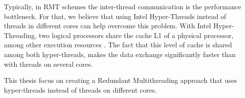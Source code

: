 Typically, in RMT schemes the inter-thread communication is the performance bottleneck. For that, we believe that using Intel Hyper-Threads instead of threads in different cores can help overcome this problem. With Intel Hyper-Threading, two logical processors share the cache L1 of a physical processor, among other execution resources \cite{Hyper-Threading}. The fact that this level of cache is shared among both hyper-threads, makes the data exchange significantly faster than with threads on several cores.

This thesis focus on creating a Redundant Multithreading approach that uses hyper-threads instead of threads on different cores. 



